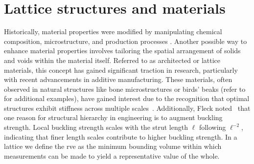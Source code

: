 \section{Lattice structures and materials}
Historically, material properties were modified by manipulating chemical composition, microstructure, and production processes . Another possible way to enhance material properties involves tailoring the spatial arrangement of solids and voids within the material itself. Referred to as architected or lattice materials, this concept has gained significant traction in research, particularly with recent advancements in additive manufacturing. These materials, often observed in natural structures like bone microstructures or birds' beaks (refer to  for additional examples), have gained interest due to the recognition that optimal structures exhibit stiffness across multiple scales~. Additionally, Fleck \etal noted~ that one reason for structural hierarchy in engineering is to augment buckling strength. Local buckling strength scales with the strut length $\ell$ following $\ell^{-2}$, indicating that finer length scales contribute to higher buckling strength. In a lattice we define the \gls{rve} as the minimum bounding volume within which measurements can be made to yield a representative value of the whole. 
